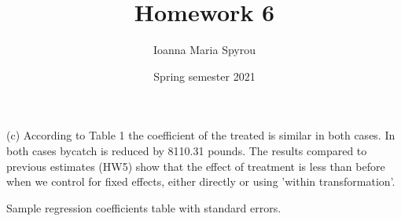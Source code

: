 \documentclass{article}
\title{Homework 6}
\author{Ioanna Maria Spyrou}
\date{Spring semester 2021}
\begin{document}
  
\maketitle


(c) According to Table 1 the coefficient of the treated is similar in both cases. In both cases bycatch is reduced by 8110.31 pounds. The results compared to previous estimates (HW5) show that the effect of treatment is less than before when we control for fixed effects, either directly or using 'within transformation'.

\begin{table}[ht]
    \centering
    
    \caption{Sample regression coefficients table with standard errors.}
    \label{tab:coeftable}
\end{table}
\end{document}

